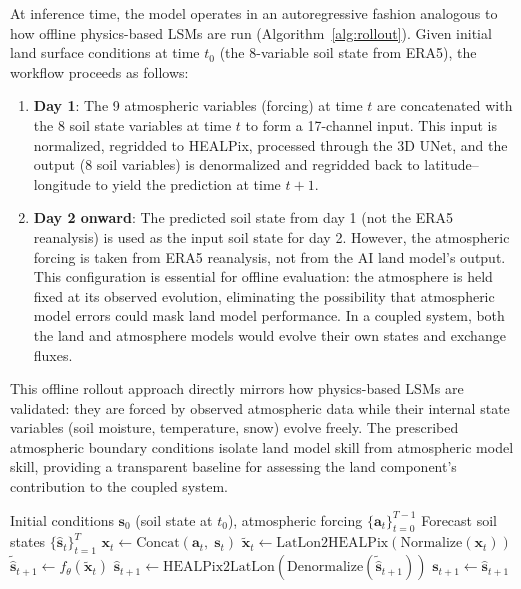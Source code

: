 \documentclass[11pt]{article}
\begin{document}
At inference time, the model operates in an autoregressive fashion analogous to how offline physics-based LSMs are run (Algorithm~\ref{alg:rollout}). Given initial land surface conditions at time $t_0$ (the 8-variable soil state from ERA5), the workflow proceeds as follows:

\begin{enumerate}
    \item \textbf{Day 1}: The 9 atmospheric variables (forcing) at time $t$ are concatenated with the 8 soil state variables at time $t$ to form a 17-channel input. This input is normalized, regridded to HEALPix, processed through the 3D UNet, and the output (8 soil variables) is denormalized and regridded back to latitude--longitude to yield the prediction at time $t+1$.
    \item \textbf{Day 2 onward}: The predicted soil state from day 1 (not the ERA5 reanalysis) is used as the input soil state for day 2. However, the atmospheric forcing is taken from ERA5 reanalysis, not from the AI land model's output. This configuration is essential for offline evaluation: the atmosphere is held fixed at its observed evolution, eliminating the possibility that atmospheric model errors could mask land model performance. In a coupled system, both the land and atmosphere models would evolve their own states and exchange fluxes.
\end{enumerate}

This offline rollout approach directly mirrors how physics-based LSMs are validated: they are forced by observed atmospheric data while their internal state variables (soil moisture, temperature, snow) evolve freely. The prescribed atmospheric boundary conditions isolate land model skill from atmospheric model skill, providing a transparent baseline for assessing the land component's contribution to the coupled system.

\begin{algorithm}[htbp]
\caption{Autoregressive rollout forecast}
\label{alg:rollout}
\begin{algorithmic}[1]
\Require Initial conditions $\mathbf{s}_0$ (soil state at $t_0$), atmospheric forcing $\{\mathbf{a}_t\}_{t=0}^{T-1}$
\Ensure Forecast soil states $\{\hat{\mathbf{s}}_t\}_{t=1}^{T}$
    \State $\mathbf{x}_t \leftarrow \text{Concat}(\mathbf{a}_t,\; \mathbf{s}_t)$ 
    \State $\tilde{\mathbf{x}}_t \leftarrow \text{LatLon2HEALPix}(\text{Normalize}(\mathbf{x}_t))$
    \State $\tilde{\hat{\mathbf{s}}}_{t+1} \leftarrow f_\theta(\tilde{\mathbf{x}}_t)$ 
    \State $\hat{\mathbf{s}}_{t+1} \leftarrow \text{HEALPix2LatLon}(\text{Denormalize}(\tilde{\hat{\mathbf{s}}}_{t+1}))$
    \State $\mathbf{s}_{t+1} \leftarrow \hat{\mathbf{s}}_{t+1}$ 
\EndFor
\end{algorithmic}
\end{algorithm}
\end{document}
